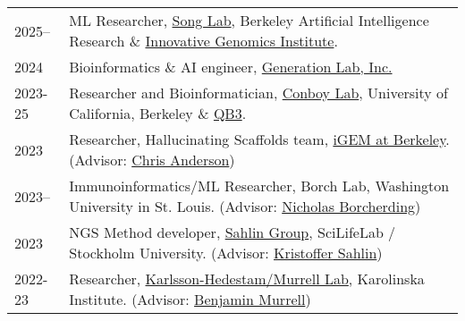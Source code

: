 \begin{longtable}[l]{@{}p{} p{}}

    2025-- & ML Researcher, \href{https://people.eecs.berkeley.edu/~yss/}{Song Lab}, Berkeley Artificial Intelligence Research \& \href{https://innovativegenomics.org/people/yun-s-song/}{Innovative Genomics Institute}. \\

    2024 & Bioinformatics \& AI engineer, \href{https://www.generationlab.com/}{Generation Lab, Inc.} \\

    2023-25 & Researcher and Bioinformatician, \href{https://conboylab.berkeley.edu/}{Conboy Lab}, University of California, Berkeley \& \href{https://qb3.berkeley.edu/}{QB3}. \\

    2023 & Researcher, Hallucinating Scaffolds team, \href{https://igem.studentorg.berkeley.edu/teams/hallucinating-scaffolds/}{iGEM at Berkeley}. (Advisor: \href{https://vcresearch.berkeley.edu/faculty/chris-anderson}{Chris Anderson}) \\

    2023-- & Immunoinformatics/ML Researcher, Borch Lab, Washington University in St. Louis. (Advisor: \href{https://www.borch.dev/}{Nicholas Borcherding}) \\

    2023 & NGS Method developer, \href{https://sahlingroup.github.io/}{Sahlin Group}, SciLifeLab / Stockholm University. (Advisor: \href{https://www.scilifelab.se/researchers/kristoffer-sahlin/}{Kristoffer Sahlin}) \\

    2022-23 & Researcher, \href{https://ki.se/en/people/benjamin-murrell}{Karlsson-Hedestam/Murrell Lab}, Karolinska Institute. (Advisor: \href{https://ki.se/en/people/benjamin-murrell}{Benjamin Murrell})

\end{longtable}
